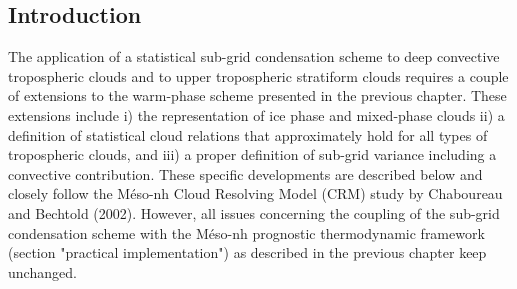 
\subsection{Introduction}
The application of a statistical sub-grid condensation scheme to deep convective
tropospheric clouds and to upper tropospheric stratiform clouds requires a
couple of extensions to the warm-phase scheme presented in the previous chapter.
These extensions include i) the representation of ice phase and mixed-phase clouds
ii) a definition of statistical cloud relations that approximately hold for all types of
tropospheric clouds, and iii)
 a proper definition of sub-grid variance including a convective contribution.
These specific developments are described below and closely follow the
M\'eso-nh Cloud Resolving Model (CRM) study by Chaboureau and Bechtold (2002).
However, all issues concerning the coupling of the sub-grid condensation scheme
with the M\'eso-nh prognostic thermodynamic framework (section "practical implementation")
as described in the previous chapter keep unchanged.

